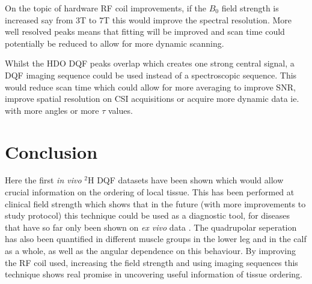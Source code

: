 \documentclass[class=article, crop=false]{standalone}
\begin{document}
On the topic of hardware RF coil improvements, if the $B_0$ field strength is increased say from 3T to 7T this would improve the spectral resolution. More well resolved peaks means that fitting will be improved and scan time could potentially be reduced to allow for more dynamic scanning.

Whilst the HDO DQF peaks overlap which creates one strong central signal, a DQF imaging sequence could be used instead of a spectroscopic sequence. This would reduce scan time which could allow for more averaging to improve SNR, improve spatial resolution on CSI acquisitions or acquire more dynamic data ie. with more angles or more $\tau$ values.

\section{Conclusion}

Here the first \textit{in vivo} $^2$H DQF datasets have been shown which would allow crucial information on the ordering of local tissue. This has been performed at clinical field strength which shows that in the future (with more improvements to study protocol) this technique could be used as a diagnostic tool, for diseases that have so far only been shown on \textit{ex vivo} data \cite{Ooms2015DoubleTissue, Sharf1995DetectionNMR-Spectroscopy, Perea20072HDisc, Sun2010InvestigationNMR}. The quadrupolar seperation has also been quantified in different muscle groups in the lower leg and in the calf as a whole, as well as the angular dependence on this behaviour. By improving the RF coil used, increasing the field strength and using imaging sequences this technique shows real promise in uncovering useful information of tissue ordering.

\end{document}
